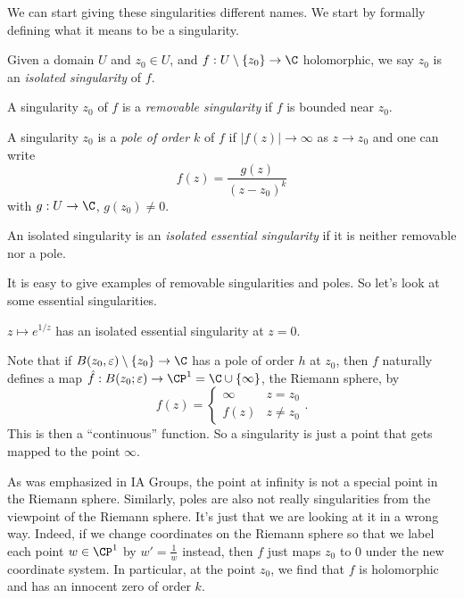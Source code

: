 \documentclass[a4paper]{article}
\begin{document}
We can start giving these singularities different names. We start by formally defining what it means to be a singularity.
\begin{defi}
  Given a domain $U$ and $z_0 \in U$, and $f: U \setminus \{z_0\} \to \C$ holomorphic, we say $z_0$ is an \emph{isolated singularity} of $f$.
\end{defi}

\begin{defi}
  A singularity $z_0$ of $f$ is a \emph{removable singularity} if $f$ is bounded near $z_0$.
\end{defi}

\begin{defi}[Pole]
  A singularity $z_0$ is a \emph{pole of order $k$} of $f$ if $|f(z)| \to \infty$ as $z \to z_0$ and one can write
  \[
    f(z) = \frac{g(z)}{(z - z_0)^k}
  \]
  with $g: U \to \C$, $g(z_0) \not= 0$.
\end{defi}

\begin{defi}
  An isolated singularity is an \emph{isolated essential singularity} if it is neither removable nor a pole.
\end{defi}

It is easy to give examples of removable singularities and poles. So let's look at some essential singularities.
\begin{eg}
  $z \mapsto e^{1/z}$ has an isolated essential singularity at $z = 0$.
\end{eg}

Note that if $B(z_0, \varepsilon) \setminus \{z_0\} \to \C$ has a pole of order $h$ at $z_0$, then $f$ naturally defines a map $\hat{f}: B (z_0; \varepsilon) \to \CP^1 = \C\cup \{\infty\}$, the Riemann sphere, by
\[
  f(z) =
  \begin{cases}
    \infty & z = z_0\\
    f(z) & z \not= z_0
  \end{cases}.
\]
This is then a ``continuous'' function. So a singularity is just a point that gets mapped to the point $\infty$.

As was emphasized in IA Groups, the point at infinity is not a special point in the Riemann sphere. Similarly, poles are also not really singularities from the viewpoint of the Riemann sphere. It's just that we are looking at it in a wrong way. Indeed, if we change coordinates on the Riemann sphere so that we label each point $w \in \CP^1$ by $w' = \frac{1}{w}$ instead, then $f$ just maps $z_0$ to $0$ under the new coordinate system. In particular, at the point $z_0$, we find that $f$ is holomorphic and has an innocent zero of order $k$.
\end{document}
